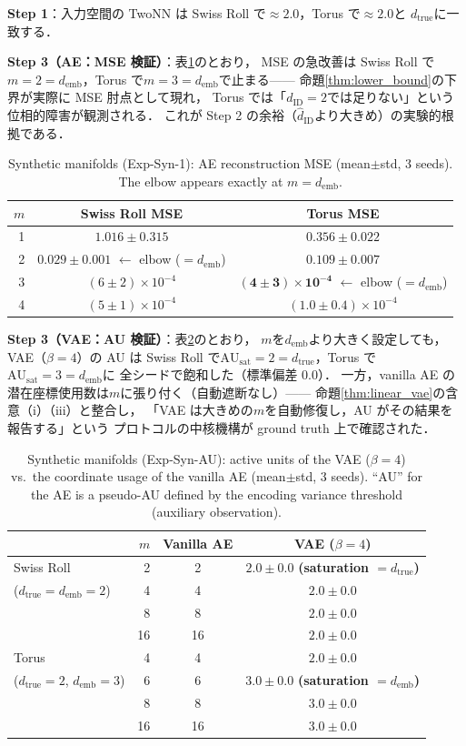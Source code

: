 \documentclass[11pt,a4paper]{jsarticle}
\newcommand{\dID}{d_{\mathrm{ID}}}
\newcommand{\hatdID}{\hat{d}_{\mathrm{ID}}}
\newcommand{\dtrue}{d_{\mathrm{true}}}
\newcommand{\AUsat}{\mathrm{AU}_{\mathrm{sat}}}
\newcommand{\demb}{d_{\mathrm{emb}}}
\begin{document}
\textbf{Step 1}：入力空間の TwoNN は Swiss Roll で$\approx 2.0$，Torus で$\approx 2.0$と
$\dtrue$に一致する．

\textbf{Step 3（AE：MSE 検証）}：表\ref{tab:e1}のとおり，
MSE の急改善は Swiss Roll で$m = 2 = \demb$，Torus で$m = 3 = \demb$で止まる——
命題\ref{thm:lower_bound}の下界が実際に MSE 肘点として現れ，
Torus では「$\dID = 2$では足りない」という位相的障害が観測される．
これが Step 2 の余裕（$\hatdID$より大きめ）の実験的根拠である．

\begin{table}[H]
\centering
\caption{Synthetic manifolds (Exp-Syn-1): AE reconstruction MSE
(mean$\pm$std, 3 seeds). The elbow appears exactly at $m = \demb$.}
\label{tab:e1}
\small
\begin{tabular}{rcc}
\toprule
$m$ & Swiss Roll MSE & Torus MSE \\
\midrule
1 & $1.016 \pm 0.315$ & $0.356 \pm 0.022$ \\
2 & $\boldsymbol{0.029 \pm 0.001}$ $\leftarrow$ elbow ($= \demb$) & $0.109 \pm 0.007$ \\
3 & $(6 \pm 2) \times 10^{-4}$ & $\boldsymbol{(4 \pm 3) \times 10^{-4}}$ $\leftarrow$ elbow ($= \demb$) \\
4 & $(5 \pm 1) \times 10^{-4}$ & $(1.0 \pm 0.4) \times 10^{-4}$ \\
\bottomrule
\end{tabular}
\end{table}

\textbf{Step 3（VAE：AU 検証）}：表\ref{tab:ea}のとおり，
$m$を$\demb$より大きく設定しても，VAE（$\beta = 4$）の AU は
Swiss Roll で$\AUsat = 2 = \dtrue$，Torus で$\AUsat = 3 = \demb$に
全シードで飽和した（標準偏差 0.0）．
一方，vanilla AE の潜在座標使用数は$m$に張り付く（自動遮断なし）——
命題\ref{thm:linear_vae}の含意（i）（iii）と整合し，
「VAE は大きめの$m$を自動修復し，AU がその結果を報告する」という
プロトコルの中核機構が ground truth 上で確認された．

\begin{table}[H]
\centering
\caption{Synthetic manifolds (Exp-Syn-AU): active units of the VAE
($\beta = 4$) vs.\ the coordinate usage of the vanilla AE
(mean$\pm$std, 3 seeds). ``AU'' for the AE is a pseudo-AU defined by the
encoding variance threshold (auxiliary observation).}
\label{tab:ea}
\small
\begin{tabular}{lrcc}
\toprule
 & $m$ & Vanilla AE & VAE ($\beta = 4$) \\
\midrule
Swiss Roll & 2 & 2 & $2.0 \pm 0.0$ \textbf{(saturation $= \dtrue$)} \\
($\dtrue = \demb = 2$) & 4 & 4 & $2.0 \pm 0.0$ \\
 & 8 & 8 & $2.0 \pm 0.0$ \\
 & 16 & 16 & $2.0 \pm 0.0$ \\
\midrule
Torus & 4 & 4 & $2.0 \pm 0.0$ \\
($\dtrue = 2$, $\demb = 3$) & 6 & 6 & $3.0 \pm 0.0$ \textbf{(saturation $= \demb$)} \\
 & 8 & 8 & $3.0 \pm 0.0$ \\
 & 16 & 16 & $3.0 \pm 0.0$ \\
\bottomrule
\end{tabular}
\end{table}
\end{document}
